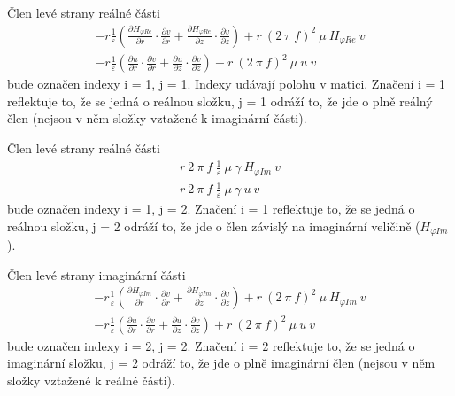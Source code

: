 \documentclass[12pt,a4paper,oneside]{article}
\numberwithin{equation}{section} %
\numberwithin{figure}{section} %
\numberwithin{table}{section} %
\begin{document}
Člen levé strany reálné části
\begin{subequations}
\begin{gather}
- r \frac{1}{\varepsilon} \left( \frac{\partial H _{\varphi Re}}{\partial r} \cdot \frac{\partial v}{\partial r} + \frac{\partial H _{\varphi Re}}{\partial z} \cdot \frac{\partial v}{\partial z} \right) + r ~ (2 ~ \pi ~ f) ^2 ~ \mu ~ H _{\varphi Re} ~ v
\\
- r \frac{1}{\varepsilon} \left( \frac{\partial u}{\partial r} \cdot \frac{\partial v}{\partial r} + \frac{\partial u}{\partial z} \cdot \frac{\partial v}{\partial z} \right) + r ~ (2 ~ \pi ~ f) ^2 ~ \mu  ~ u ~ v
\end{gather}
\end{subequations}
bude označen indexy i = 1, j = 1. Indexy udávají polohu v matici. Značení i = 1 reflektuje to, že se jedná o reálnou složku, j = 1 odráží to, že jde o plně reálný člen (nejsou v něm složky vztažené k imaginární části). 

Člen levé strany reálné části
\begin{subequations}
\begin{gather}
r ~ 2 ~ \pi ~ f ~ \frac{1}{\varepsilon} ~ \mu ~ \gamma ~ H _{\varphi Im} ~ v
\\
r ~ 2 ~ \pi ~ f ~ \frac{1}{\varepsilon} ~ \mu ~ \gamma ~ u ~ v
\end{gather}
\end{subequations}
bude označen indexy i = 1, j = 2. Značení i = 1 reflektuje to, že se jedná o reálnou složku, j = 2 odráží to, že jde o člen závislý na imaginární veličině ($H _{\varphi Im}$).


Člen levé strany imaginární části
\begin{subequations}
\begin{gather}
- r \frac{1}{\varepsilon} \left( \frac{\partial H _{\varphi Im}}{\partial r} \cdot \frac{\partial v}{\partial r} + \frac{\partial H _{\varphi Im}}{\partial z} \cdot \frac{\partial v}{\partial z} \right) + r ~ (2 ~ \pi ~ f) ^2 ~ \mu ~ H _{\varphi Im} ~ v
\\
- r \frac{1}{\varepsilon} \left( \frac{\partial u}{\partial r} \cdot \frac{\partial v}{\partial r} + \frac{\partial u}{\partial z} \cdot \frac{\partial v}{\partial z} \right) + r ~ (2 ~ \pi ~ f) ^2 ~ \mu ~ u ~ v
\end{gather}
\end{subequations}
bude označen indexy i = 2, j = 2. Značení i = 2 reflektuje to, že se jedná o imaginární složku, j = 2 odráží to, že jde o plně imaginární člen (nejsou v něm složky vztažené k reálné části). 
\end{document}
